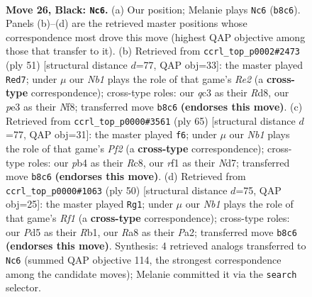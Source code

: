 \documentclass[11pt]{article}
\begin{document}
\clearpage

\begin{figure}[p]\centering
\begin{subfigure}{0.46\textwidth}\centering
\resizebox{\linewidth}{!}{%
\newchessgame
\chessboard[
  setfen={rnr5/pppbk3/q4p2/P2p4/1P1P4/2Q1P1P1/8/RNB2RK1 b - - 1 26},
  showmover=false,
  pgfstyle=straightmove, color=movearrow, markmove={b8-c6}
]}
\caption{}
\end{subfigure}\hfill
\begin{subfigure}{0.46\textwidth}\centering
\resizebox{\linewidth}{!}{%
\newchessgame
\chessboard[
  setfen={3r1nk1/pb2rp1p/4q3/p7/3PBp2/5P2/3N1QPP/R2R2K1 b - - 3 26},
  showmover=false,
  pgfstyle=straightmove, color=movearrow, markmove={e7-d7}
]}
\caption{}
\end{subfigure}
\\[4pt]
\begin{subfigure}{0.46\textwidth}\centering
\resizebox{\linewidth}{!}{%
\newchessgame
\chessboard[
  setfen={2r1r1k1/3n1pp1/pp5p/4pq2/2P4P/1P4P1/PB1RQP1K/4R3 b - - 0 33},
  showmover=false,
  pgfstyle=straightmove, color=movearrow, markmove={f7-f6}
]}
\caption{}
\end{subfigure}\hfill
\begin{subfigure}{0.46\textwidth}\centering
\resizebox{\linewidth}{!}{%
\newchessgame
\chessboard[
  setfen={r1b2qk1/p1p3p1/2Pp1r2/2nP2Q1/3Np2P/8/P4PBP/1R3R1K w - - 4 26},
  showmover=false,
  pgfstyle=straightmove, color=movearrow, markmove={f1-g1}
]}
\caption{}
\end{subfigure}
\caption{\textbf{Move 26, Black: \texttt{Nc6}.} (a) Our position; Melanie plays \texttt{Nc6} (\texttt{b8c6}). Panels (b)--(d) are the retrieved master positions whose correspondence most drove this move (highest QAP objective among those that transfer to it). (b) Retrieved from \texttt{ccrl\_top\_p0002\#2473} (ply 51) [structural distance $d$=77, QAP obj=33]: the master played \texttt{Red7}; under $\mu$ our \emph{Nb1} plays the role of that game's \emph{Re2} (a \textbf{cross-type} correspondence); cross-type roles: our \emph{q}c3 as their \emph{R}d8, our \emph{p}e3 as their \emph{N}f8; transferred move \texttt{b8c6} \textbf{(endorses this move)}. (c) Retrieved from \texttt{ccrl\_top\_p0000\#3561} (ply 65) [structural distance $d$=77, QAP obj=31]: the master played \texttt{f6}; under $\mu$ our \emph{Nb1} plays the role of that game's \emph{Pf2} (a \textbf{cross-type} correspondence); cross-type roles: our \emph{p}b4 as their \emph{R}c8, our \emph{r}f1 as their \emph{N}d7; transferred move \texttt{b8c6} \textbf{(endorses this move)}. (d) Retrieved from \texttt{ccrl\_top\_p0000\#1063} (ply 50) [structural distance $d$=75, QAP obj=25]: the master played \texttt{Rg1}; under $\mu$ our \emph{Nb1} plays the role of that game's \emph{Rf1} (a \textbf{cross-type} correspondence); cross-type roles: our \emph{P}d5 as their \emph{R}b1, our \emph{R}a8 as their \emph{P}a2; transferred move \texttt{b8c6} \textbf{(endorses this move)}. Synthesis: 4 retrieved analogs transferred to \texttt{Nc6} (summed QAP objective 114, the strongest correspondence among the candidate moves); Melanie committed it via the \texttt{search} selector.}
\label{fig:thought-m51}
\end{figure}
\end{document}
